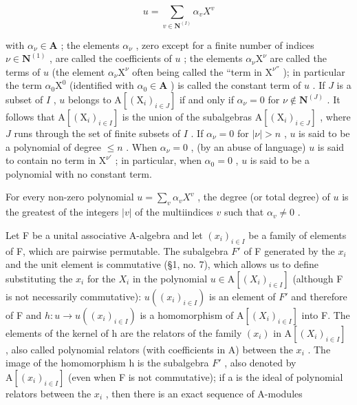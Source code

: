 \[
u = \sum_ {v \in \mathbf {N} ^ {(I)}} \alpha_ {v} X ^ {v}
\]

with \(\alpha_{\nu} \in \mathbf{A}\) ; the elements \(\alpha_{\nu}\) , zero except for a finite number of indices \(\nu \in \mathbf{N}^{(1)}\) , are called the coefficients of \(u\) ; the elements \(\alpha_{\nu} \mathrm{X}^{\nu}\) are called the terms of \(u\) (the element \(\alpha_{\nu} \mathrm{X}^{\nu}\) often being called the ``term in \(\mathrm{X}^{\nu''}\) ); in particular the term \(\alpha_{0} \mathrm{X}^{0}\) (identified with \(\alpha_{0} \in \mathbf{A}\) ) is called the constant term of \(u\) . If \(J\) is a subset of \(I\) , \(u\) belongs to \(\mathrm{A}[(\mathrm{X}_{i})_{i \in J}]\) if and only if \(\alpha_{\nu} = 0\) for \(\nu \notin \mathbf{N}^{(J)}\) . It follows that \(\mathrm{A}[(\mathrm{X}_{i})_{i \in I}]\) is the union of the subalgebras \(\mathrm{A}[(\mathrm{X}_{i})_{i \in J}]\) , where \(J\) runs through the set of finite subsets of \(I\) . If \(\alpha_{\nu} = 0\) for \(|\nu| > n\) , \(u\) is said to be a polynomial of degree \(\leqslant n\) . When \(\alpha_{\nu} = 0\) , (by an abuse of language) \(u\) is said to contain no term in \(\mathrm{X}^{\nu'}\) ; in particular, when \(\alpha_{0} = 0\) , \(u\) is said to be a polynomial with no constant term.

For every non-zero polynomial \(u = \sum_{v} \alpha_v X^v\) , the degree (or total degree) of \(u\) is the greatest of the integers \(|v|\) of the multiindices \(v\) such that \(\alpha_v \neq 0\) .

Let F be a unital associative A-algebra and let \((x_{i})_{i\in I}\) be a family of elements of F, which are pairwise permutable. The subalgebra \(F'\) of F generated by the \(x_{i}\) and the unit element is commutative (§1, no. 7), which allows us to define substituting the \(x_{i}\) for the \(X_{i}\) in the polynomial \(u\in\mathrm{A}[(X_{i})_{i\in I}]\) (although F is not necessarily commutative): \(u((x_{i})_{i\in I})\) is an element of \(F'\) and therefore of F and \(h\colon u\to u((x_{i})_{i\in I})\) is a homomorphism of \(\mathrm{A}[(X_{i})_{i\in I}]\) into F. The elements of the kernel of h are the relators of the family \((x_{i})\) in \(\mathrm{A}[(X_{i})_{i\in I}]\) , also called polynomial relators (with coefficients in A) between the \(x_{i}\) . The image of the homomorphism h is the subalgebra \(F'\) , also denoted by \(\mathrm{A}[(x_{i})_{i\in I}]\) (even when F is not commutative); if a is the ideal of polynomial relators between the \(x_{i}\) , then there is an exact sequence of A-modules

